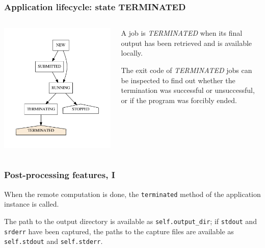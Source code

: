 \documentclass[english,serif,mathserif,xcolor=pdftex,dvipsnames,table]{beamer}
\begin{document}
\begin{frame}[fragile]
\frametitle{Application lifecycle: state TERMINATED}

\begin{columns}[c]
  \begin{column}{0.5\textwidth}
    \includegraphics[height=0.7\textheight]{fig/states-TERMINATED}
  \end{column}
  \begin{column}{0.5\textwidth}
    \raggedleft
    A job is \emph{TERMINATED} when its final output has been
    retrieved and is available locally.

    \+
    The exit code of \emph{TERMINATED} jobs can be inspected to
    find out whether the termination was successful or unsuccessful,
    or if the program was forcibly ended.
  \end{column}
\end{columns}
\end{frame}


\begin{frame}[fragile]
  \frametitle{Post-processing features, I}

  When the remote computation is done, the \texttt{terminated} method
  of the application instance is called.

  \+
  The path to the output directory is available as
  \lstinline|self.output_dir|; if \texttt{stdout} and \texttt{srderr}
  have been captured, the paths to the capture files are available as
  \lstinline|self.stdout| and \lstinline|self.stderr|.
\end{frame}
\end{document}

